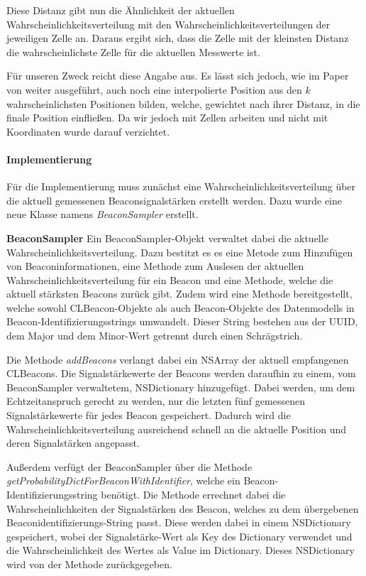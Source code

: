Diese Distanz gibt nun die Ähnlichkeit der aktuellen Wahrscheinlichkeitsverteilung mit den Wahrscheinlichkeitsverteilungen der jeweiligen Zelle an. Daraus ergibt sich, dass die Zelle mit der kleinsten Distanz die wahrscheinlichste Zelle für die aktuellen Messwerte ist.

Für unseren Zweck reicht diese Angabe aus. Es lässt sich jedoch, wie im Paper von \citet{wifiFingerprintProbability} weiter ausgeführt, auch noch eine interpolierte Position aus den $k$ wahrscheinlichsten Positionen bilden, welche, gewichtet nach ihrer Distanz, in die finale Position einfließen. Da wir jedoch mit Zellen arbeiten und nicht mit Koordinaten wurde darauf verzichtet. 

\paragraph{Implementierung}
\label{sec:implementation:fingerprinting:positioning:probability:implementiation}
Für die Implementierung muss zunächst eine Wahrscheinlichkeitsverteilung über die aktuell gemessenen Beaconsignalstärken erstellt werden. Dazu wurde eine neue Klasse namens \emph{BeaconSampler} erstellt. 


\textbf{BeaconSampler}
Ein BeaconSampler-Objekt verwaltet dabei die aktuelle Wahrscheinlichkeitsverteilung. Dazu bestitzt es es eine Metode zum Hinzufügen von Beaconinformationen, eine Methode zum Auslesen der aktuellen Wahrscheinlichkeitsverteilung für ein Beacon und eine Methode, welche die aktuell stärksten Beacons zurück gibt. Zudem wird eine Methode bereitgestellt, welche sowohl CLBeacon-Objekte als auch Beacon-Objekte des Datenmodells in Beacon-Identifizierungsstrings umwandelt. Dieser String bestehen aus der UUID, dem Major und dem Minor-Wert getrennt durch einen Schrägstrich.

Die Methode \emph{addBeacons} verlangt dabei ein NSArray der aktuell empfangenen CLBeacons. Die Signalstärkewerte der Beacons werden daraufhin zu einem, vom BeaconSampler verwaltetem, NSDictionary hinzugefügt. Dabei werden, um dem Echtzeitanspruch gerecht zu werden, nur die letzten fünf gemessenen Signalstärkewerte für jedes Beacon gespeichert. Dadurch wird die Wahrscheinlichkeitsverteilung ausreichend schnell an die aktuelle Position und deren Signalstärken angepasst.

Außerdem verfügt der BeaconSampler über die Methode \emph{getProbabilityDictForBeaconWithIdentifier}, welche ein Beacon-Identifizierungsstring benötigt. Die Methode errechnet dabei die Wahrscheinlichkeiten der Signalstärken des Beacon, welches zu dem übergebenen Beaconidentifizierungs-String passt. Diese werden dabei in einem NSDictionary gespeichert, wobei der Signalstärke-Wert als Key des Dictionary verwendet und die Wahrscheinlichkeit des Wertes als Value im Dictionary. Dieses NSDictionary wird von der Methode zurückgegeben.

